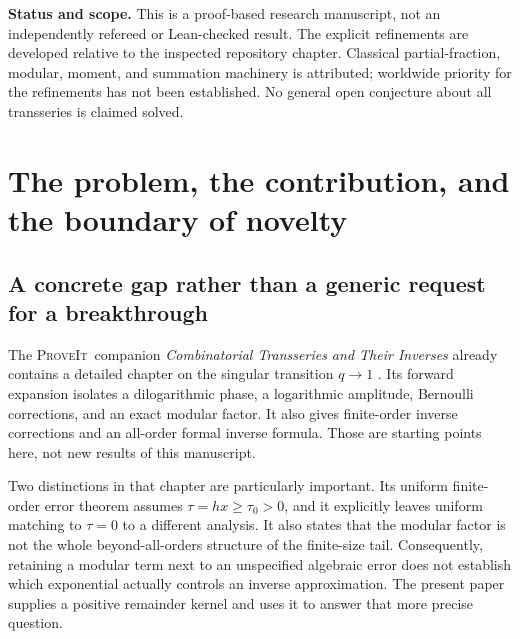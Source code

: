 \documentclass[11pt,a4paper]{article}
\newcommand{\ee}{\mathrm e}
\newcommand{\repo}{\textsc{ProveIt}}
\numberwithin{equation}{section}
\theoremstyle{plain}
\theoremstyle{definition}
\theoremstyle{remark}
\begin{document}
\begin{titlepage}
\begin{abstract}
The main quantitative result identifies the optimally truncated finite-size
remainder, including its first relative correction. Its leading value is
$(-1)^{M+1}\ee^{-2\pi x}/(\pi\sqrt{x})$ when $M=\pi x+O(1)$ and $hx$ stays
in a compact positive interval. Combining it with the modular term
$\ee^{-4\pi^2/h}$ gives a stable additive law for inverse errors. Their true
balance occurs in a logarithmically shifted window, not exactly at $hx=2\pi$;
even and odd truncations respectively cancel and reinforce. A multinomial
extension shows that the shortest block and its multiplicity determine the
leading optimal remainder. Complete proofs, reproducible exact-rational and
high-precision checks, a repository crosswalk, and a further-research agenda
are included.
\end{abstract}
\vfill
\begin{resultbox}
\small\textbf{Status and scope.} This is a proof-based research manuscript,
not an independently refereed or Lean-checked result. The explicit refinements
are developed relative to the inspected repository chapter. Classical
partial-fraction, modular, moment, and summation machinery is attributed;
worldwide priority for the refinements has not been established. No general
open conjecture about all transseries is claimed solved.
\end{resultbox}
\end{titlepage}
\hypersetup{pageanchor=true}

\tableofcontents
\newpage

\section{The problem, the contribution, and the boundary of novelty}
\label{sec:scope}

\subsection{A concrete gap rather than a generic request for a breakthrough}
The \repo\ companion \emph{Combinatorial Transseries and Their Inverses}
already contains a detailed chapter on the singular transition $q\to1$
\cite{repo}. Its forward expansion isolates a dilogarithmic phase, a logarithmic
amplitude, Bernoulli corrections, and an exact modular factor. It also gives
finite-order inverse corrections and an all-order formal inverse formula.
Those are starting points here, not new results of this manuscript.

Two distinctions in that chapter are particularly important. Its uniform
finite-order error theorem assumes $\tau=hx\ge\tau_0>0$, and it explicitly
leaves uniform matching to $\tau=0$ to a different analysis. It also states
that the modular factor is not the whole beyond-all-orders structure of the
finite-size tail. Consequently, retaining a modular term next to an unspecified
algebraic error does not establish which exponential actually controls an
inverse approximation. The present paper supplies a positive remainder kernel
and uses it to answer that more precise question.
\end{document}
